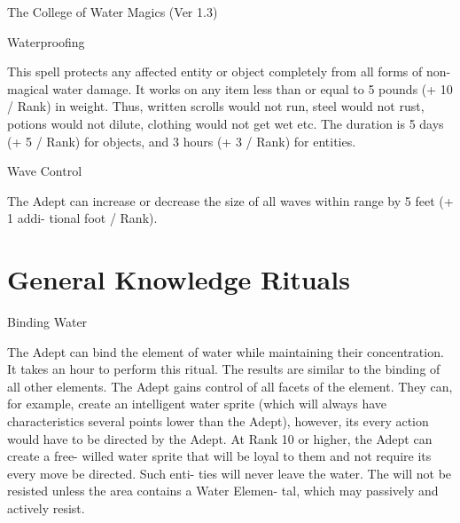 \begin{Chapter}{The College of Water Magics (Ver 1.3)}
\begin{spell}[G-13]{Waterproofing }

\begin{effects}
 This  spell  protects  any  affected  entity  or 
object  completely  from  all  forms  of  non-magical 
water  damage.  It  works  on  any  item  less  than  or 
equal  to  5  pounds  (+  10  /  Rank)  in  weight.  Thus, 
written scrolls would not run, steel would not rust, 
potions  would  not  dilute,  clothing  would  not  get 
wet  etc.  The  duration  is  5  days  (+  5  /  Rank)  for 
objects, and 3 hours (+ 3 / Rank) for entities. 

\end{effects}
\end{spell}

\begin{spell}[G-14]{Wave Control }

\begin{effects}
 The  Adept  can  increase  or  decrease  the 
size of all  waves  within range by 5 feet (+ 1 addi-
tional foot / Rank). 

\end{effects}
\end{spell}

\section{General Knowledge Rituals}

\begin{ritual}[Q-1]{Binding Water }

\begin{effects}
 The  Adept  can  bind  the  element  of  water 
while  maintaining  their  concentration.  It  takes  an 
hour  to  perform  this  ritual.  The  results  are  similar 
to  the  binding  of  all  other  elements.  The  Adept 
gains control of all facets of the element. They can, 
for  example,  create  an  intelligent  water  sprite 
(which  will  always  have  characteristics  several 
points  lower  than  the  Adept),  however,  its  every 
action would have to be directed by the Adept. At 
Rank  10  or  higher,  the  Adept  can  create  a  free-
willed  water  sprite  that  will  be  loyal  to  them  and 
not  require  its  every  move  be  directed.  Such  enti-
ties  will  never  leave  the  water.  The  will  not  be 
resisted  unless  the  area  contains  a  Water  Elemen-
tal, which may passively and actively resist. 



\end{effects}
\end{ritual}
\end{Chapter}
